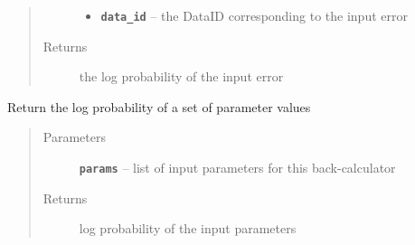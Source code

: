 \documentclass[letterpaper,10pt,english]{sphinxmanual}
\begin{document}
\begin{fulllineitems}
\begin{fulllineitems}
\begin{quote}
\begin{description}
\begin{itemize}
\item {} 
\textbf{\texttt{data\_id}} -- the DataID corresponding to the input error

\end{itemize}

\item[{Returns}] \leavevmode
the log probability of the input error

\end{description}\end{quote}

\end{fulllineitems}


\begin{fulllineitems}
\label{modules:backcalc.BaseBackCalculator.logp_params}
Return the log probability of a set of parameter values
\begin{quote}\begin{description}
\item[{Parameters}] \leavevmode
\textbf{\texttt{params}} -- list of input parameters for this back-calculator

\item[{Returns}] \leavevmode
log probability of the input parameters

\end{description}\end{quote}

\end{fulllineitems}


\end{fulllineitems}

\end{document}
